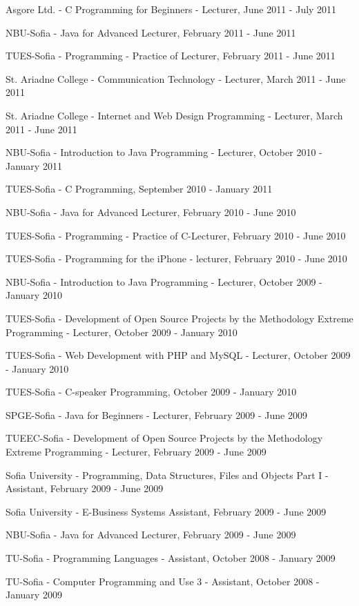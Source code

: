 \documentclass[english,a4paper]{europasscv}
\begin{document}
\begin{europasscv}
{\begin{ecvitemize}
    \item Asgore Ltd. - C Programming for Beginners - Lecturer, June 2011 - July 2011
    \item NBU-Sofia - Java for Advanced Lecturer, February 2011 - June 2011
    \item TUES-Sofia - Programming - Practice of Lecturer, February 2011 - June 2011
    \item St. Ariadne College - Communication Technology - Lecturer, March 2011 - June 2011
    \item St. Ariadne College - Internet and Web Design Programming - Lecturer, March 2011 - June 2011
    \item NBU-Sofia - Introduction to Java Programming - Lecturer, October 2010 - January 2011
    \item TUES-Sofia - C Programming, September 2010 - January 2011
    \item NBU-Sofia - Java for Advanced Lecturer, February 2010 - June 2010
    \item TUES-Sofia - Programming - Practice of C-Lecturer, February 2010 - June 2010
    \item TUES-Sofia - Programming for the iPhone - lecturer, February 2010 - June 2010
    \item NBU-Sofia - Introduction to Java Programming - Lecturer, October 2009 - January 2010
    \item TUES-Sofia - Development of Open Source Projects by the Methodology Extreme Programming - Lecturer, October 2009 - January 2010
    \item TUES-Sofia - Web Development with PHP and MySQL - Lecturer, October 2009 - January 2010
    \item TUES-Sofia - C-speaker Programming, October 2009 - January 2010
    \item SPGE-Sofia - Java for Beginners - Lecturer, February 2009 - June 2009
    \item TUEEC-Sofia - Development of Open Source Projects by the Methodology Extreme Programming - Lecturer, February 2009 - June 2009
    \item Sofia University - Programming, Data Structures, Files and Objects Part I - Assistant, February 2009 - June 2009
    \item Sofia University - E-Business Systems Assistant, February 2009 - June 2009
    \item NBU-Sofia - Java for Advanced Lecturer, February 2009 - June 2009
    \item TU-Sofia - Programming Languages - Assistant, October 2008 - January 2009
    \item TU-Sofia - Computer Programming and Use 3 - Assistant, October 2008 - January 2009 
  \end{ecvitemize}}
  

\end{europasscv}
\end{document}
